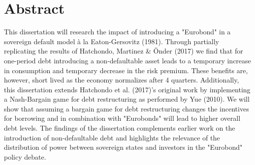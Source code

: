 \chapter*{Abstract\hfill} 

This dissertation will research the impact of introducing a "Eurobond" in a sovereign default model à la Eaton-Gersovitz (1981). Through partially replicating the results of Hatchondo, Martinez \& Önder (2017) we find that for one-period debt introducing a non-defaultable asset leads to a temporary increase in consumption and temporary decrease in the risk premium. These benefits are, however, short lived as the economy normalizes after 4 quarters. Additionally, this dissertation extends Hatchondo et al. (2017)'s original work by implementing a Nash-Bargain game for debt restructuring as performed by Yue (2010). We will show that assuming a bargain game for debt restructuring changes the incentives for borrowing and in combination with "Eurobonds" will lead to higher overall debt levels. The findings of the dissertation complements earlier work on the introduction of non-defaultable debt and highlights the relevance of the distribution of power between sovereign states and investors in the "Eurobond" policy debate.


